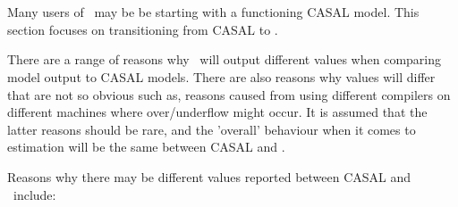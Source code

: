 \section{\label{sec:setupCasal2}}

Many users of \CNAME\ may be be starting with a functioning CASAL model. This section focuses on transitioning from CASAL to \CNAME.

There are a range of reasons why \CNAME\ will output different values when comparing model output to CASAL models. There are also reasons why values will differ that are not so obvious such as, reasons caused from using different compilers on different machines where over/underflow might occur. It is assumed that the latter reasons  should be rare, and the 'overall' behaviour when it comes to estimation will be the same between CASAL and \CNAME.

Reasons why there may be different values reported between CASAL and \CNAME\ include:

